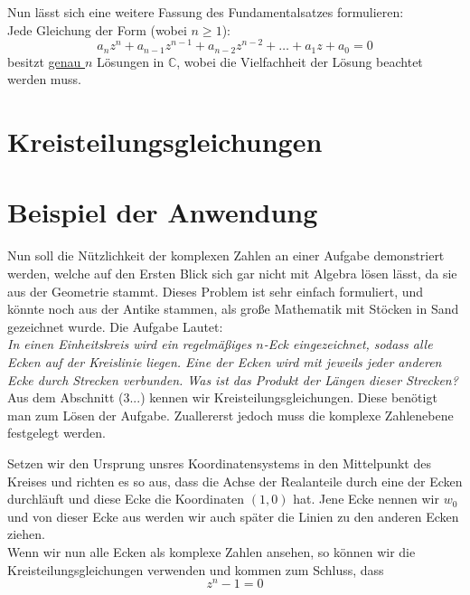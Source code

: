 \documentclass[a4paper,12pt]{article} %
\begin{document}
\noindent Nun lässt sich eine weitere Fassung des Fundamentalsatzes formulieren:\\

\noindent Jede Gleichung der Form (wobei $n \geq 1$):
\begin{equation}\label{eq:funda2}
	\boxed{	a_nz^n + a_{n-1}z^{n-1} + a_{n-2}z^{n-2} + \dots + a_1z + a_0 = 0
	}
\end{equation}
besitzt \underline{genau $n$} Lösungen in $\mathbb{C}$, wobei die Vielfachheit der Lösung beachtet werden muss.


\section{Kreisteilungsgleichungen}

\section{Beispiel der Anwendung}

Nun soll die Nützlichkeit der komplexen Zahlen an einer Aufgabe demonstriert werden, welche auf den Ersten Blick sich gar nicht mit Algebra lösen lässt, da sie aus der Geometrie stammt. Dieses Problem ist sehr einfach formuliert, und könnte noch aus der Antike stammen, als große Mathematik mit Stöcken in Sand gezeichnet wurde. Die Aufgabe Lautet:\\

\noindent \textit{In einen Einheitskreis wird ein regelmäßiges $n$-Eck eingezeichnet, sodass alle Ecken auf der Kreislinie liegen.
Eine der Ecken wird mit jeweils jeder anderen Ecke durch Strecken verbunden.
Was ist das Produkt der Längen dieser Strecken?
}\\

Aus dem Abschnitt (3...) kennen  wir Kreisteilungsgleichungen. Diese benötigt man zum Lösen der Aufgabe. Zuallererst jedoch muss die komplexe Zahlenebene festgelegt werden. 

Setzen wir den Ursprung unsres Koordinatensystems in den Mittelpunkt des Kreises und richten es so aus, dass die Achse der Realanteile durch eine der Ecken durchläuft und diese Ecke die Koordinaten $(1,0)$ hat.
Jene Ecke nennen wir $w_0$ und von dieser Ecke aus werden wir auch später die Linien zu den anderen Ecken ziehen.\\

Wenn wir nun alle Ecken als komplexe Zahlen ansehen, so können wir die Kreisteilungsgleichungen verwenden und kommen zum Schluss, dass
\begin{equation}
	z^n-1=0
\end{equation}
\end{document}
